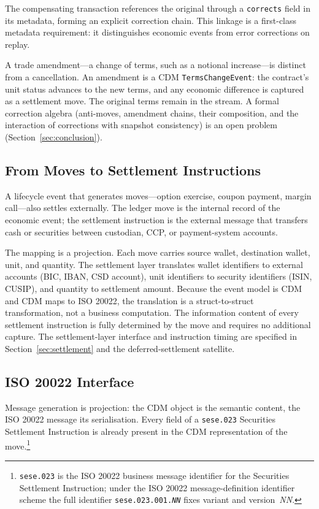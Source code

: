 \documentclass[11pt,a4paper]{article}
\begin{document}
The compensating transaction references the original through a \texttt{corrects} field in its metadata, forming an explicit correction chain. This linkage is a first-class metadata requirement: it distinguishes economic events from error corrections on replay.

A trade amendment---a change of terms, such as a notional increase---is distinct from a cancellation. An amendment is a CDM \texttt{TermsChangeEvent}: the contract's unit status advances to the new terms, and any economic difference is captured as a settlement move. The original terms remain in the stream. A formal correction algebra (anti-moves, amendment chains, their composition, and the interaction of corrections with snapshot consistency) is an open problem (Section~\ref{sec:conclusion}).

\subsection{From Moves to Settlement Instructions}
\label{sec:implementation-settlement}

A lifecycle event that generates moves---option exercise, coupon payment, margin call---also settles externally. The ledger move is the internal record of the economic event; the settlement instruction is the external message that transfers cash or securities between custodian, CCP, or payment-system accounts.

The mapping is a projection. Each move carries source wallet, destination wallet, unit, and quantity. The settlement layer translates wallet identifiers to external accounts (BIC, IBAN, CSD account), unit identifiers to security identifiers (ISIN, CUSIP), and quantity to settlement amount. Because the event model is CDM and CDM maps to ISO 20022, the translation is a struct-to-struct transformation, not a business computation. The information content of every settlement instruction is fully determined by the move and requires no additional capture. The settlement-layer interface and instruction timing are specified in Section~\ref{sec:settlement} and the deferred-settlement satellite.

\subsection{ISO 20022 Interface}
\label{sec:implementation-iso}

Message generation is projection: the CDM object is the semantic content, the ISO 20022 message its serialisation. Every field of a \texttt{sese.023} Securities Settlement Instruction is already present in the CDM representation of the move.\footnote{\texttt{sese.023} is the ISO 20022 business message identifier for the Securities Settlement Instruction; under the ISO 20022 message-definition identifier scheme the full identifier \texttt{sese.023.001.\textit{NN}} fixes variant and version~\textit{NN}.}
\end{document}
